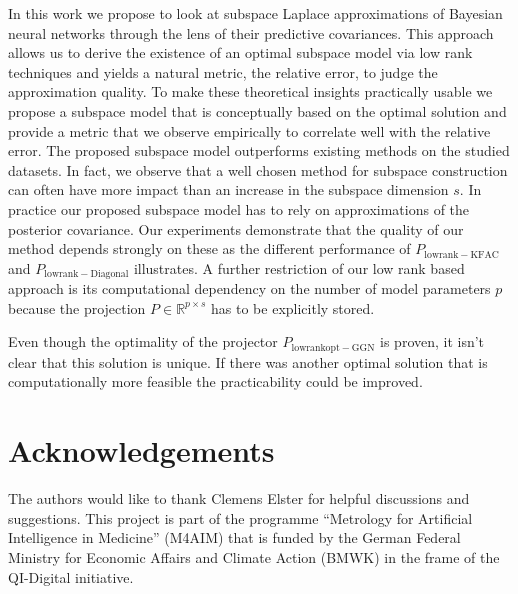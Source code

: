 In this work we propose to look at subspace Laplace approximations of Bayesian neural networks through the lens of their predictive covariances. This approach allows us to derive the existence of an optimal subspace model via low rank techniques and yields a natural metric, the relative error, to judge the approximation quality. To make these theoretical insights practically usable we propose a subspace model that is conceptually based on the optimal solution and provide a metric that we observe empirically to correlate well with the relative error. The proposed subspace model outperforms existing methods on the studied datasets.
In fact, we observe that a well chosen method for subspace construction can often have more impact than an increase in the subspace dimension $s$.
In practice our proposed subspace model has to rely on approximations of the posterior covariance. Our experiments demonstrate that the quality of our method depends strongly on these as the different performance of $P_{\mathrm{lowrank-KFAC}}$ and $P_{\mathrm{lowrank-Diagonal}}$ illustrates.  A further restriction of our low rank based approach is its computational dependency on the number of model parameters $p$ because the projection $P \in \mathbb{R}^{p \times s}$ has to be explicitly stored. 

Even though the optimality of the projector $P_{\mathrm{lowrankopt-GGN}}$ is proven, it isn't clear that this solution is unique. If there was another optimal solution that is computationally more feasible the practicability could be improved.

\section*{Acknowledgements}

The authors would like to thank Clemens Elster for helpful discussions and suggestions. This project is part of the programme ``Metrology for Artificial Intelligence in Medicine'' (M4AIM) that is funded by the German Federal Ministry for Economic Affairs and Climate Action (BMWK) in the frame of the QI-Digital initiative.
